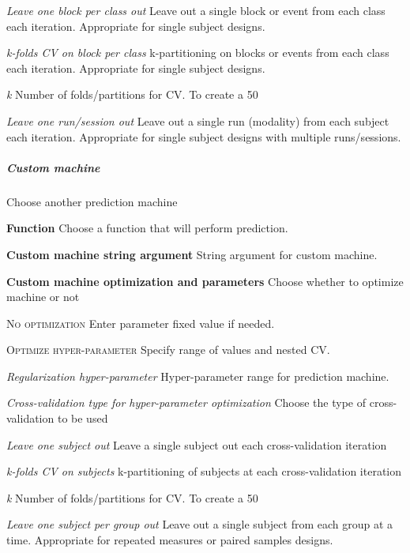 \textit{Leave one block per class out}
Leave out a single block or event from each class each iteration. Appropriate for single subject designs.


\textit{k-folds CV on block per class}
k-partitioning on blocks or events from each class each iteration. Appropriate for single subject designs.


\textit{k}
Number of folds/partitions for CV. To create a 50%


\textit{Leave one run/session out}
Leave out a single run (modality) from each subject each iteration. Appropriate for single subject designs with multiple runs/sessions.


\subparagraph{Custom machine}
Choose another prediction machine


\textbf{Function}
Choose a function that will perform prediction.


\textbf{Custom machine string argument}
String argument for custom machine.


\textbf{Custom machine optimization and parameters}
Choose whether to optimize machine or not


\textsc{No optimization}
Enter parameter fixed value if needed.


\textsc{Optimize hyper-parameter}
Specify range of values and nested CV.


\textsl{Regularization hyper-parameter}
Hyper-parameter range for prediction machine.


\textsl{Cross-validation type for hyper-parameter optimization}
Choose the type of cross-validation to be used


\textit{Leave one subject out}
Leave a single subject out each cross-validation iteration


\textit{k-folds CV on subjects}
k-partitioning of subjects at each cross-validation iteration


\textit{k}
Number of folds/partitions for CV. To create a 50%


\textit{Leave one subject per group out}
Leave out a single subject from each group at a time. Appropriate for repeated measures or paired samples designs.


